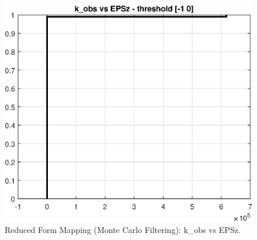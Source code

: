 
\begin{figure}[H]
\centering 
\includegraphics[width=1.00\textwidth]{RBC_kz/gsa/redform_prior/k_obs_vs_EPSz_threshold/RBC_kz_prior_k_obs_vs_EPSz}
\caption{Reduced Form Mapping (Monte Carlo Filtering): k\_obs vs EPSz.}\label{Fig:prior_k_obs_vs_EPSz}
\end{figure}

